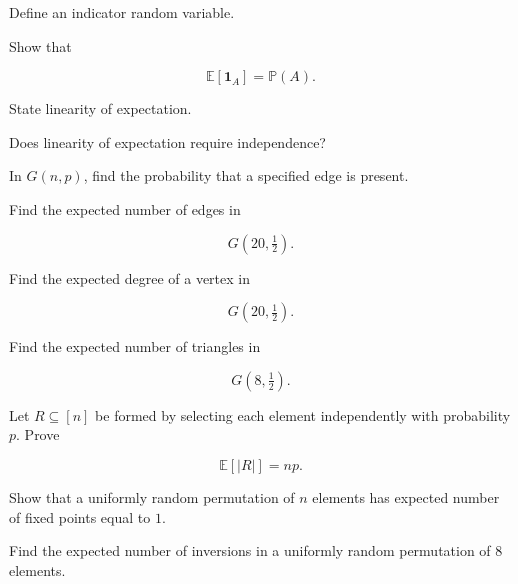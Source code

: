 \begin{exercise}[1]
Define an indicator random variable.
\end{exercise}

\begin{exercise}[1]
Show that

\[
\mathbb{E}[\mathbf{1}_A]
=
\mathbb{P}(A).
\]
\end{exercise}

\begin{exercise}[1]
State linearity of expectation.
\end{exercise}

\begin{exercise}[1]
Does linearity of expectation require independence?
\end{exercise}

\begin{exercise}[1]
In \(G(n,p)\), find the probability that a specified edge is present.
\end{exercise}

\begin{exercise}[1]
Find the expected number of edges in

\[
G(20,\tfrac12).
\]
\end{exercise}

\begin{exercise}[1]
Find the expected degree of a vertex in

\[
G(20,\tfrac12).
\]
\end{exercise}

\begin{exercise}[1]
Find the expected number of triangles in

\[
G(8,\tfrac12).
\]
\end{exercise}

\begin{exercise}[2]
Let \(R\subseteq[n]\) be formed by selecting each element independently
with probability \(p\). Prove

\[
\mathbb{E}[|R|]=np.
\]
\end{exercise}

\begin{exercise}[2]
Show that a uniformly random permutation of \(n\) elements has expected
number of fixed points equal to \(1\).
\end{exercise}

\begin{exercise}[2]
Find the expected number of inversions in a uniformly random
permutation of \(8\) elements.
\end{exercise}

